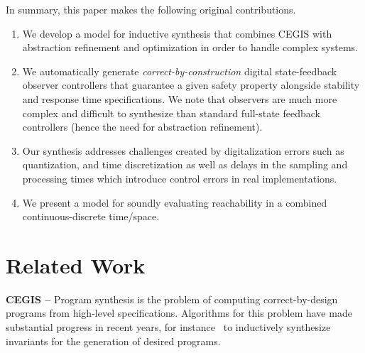 \documentclass[sigconf]{llncs}
\renewcommand{\note}[1]{\textcolor{red}{[#1]}}
\begin{document}
In summary, this paper makes the following original contributions.
%
\begin{enumerate}
%
\item We develop a model for inductive synthesis that combines CEGIS with
  abstraction refinement and optimization in order to handle complex
  systems. 
%
\item We automatically generate \emph{correct-by-construction} digital
  state-feedback observer controllers that guarantee a given safety property
  alongside stability and response time specifications.  We note that
  observers are much more complex and difficult to synthesize than standard
  full-state feedback controllers (hence the need for abstraction refinement).
%
\item  Our synthesis addresses challenges created by digitalization errors
 such as quantization, and time discretization as well as delays in the
 sampling and processing times which introduce control errors in real
 implementations.
 \item We present a model for soundly evaluating reachability in a combined 
 continuous-discrete time/space. 
%
\end{enumerate}


\section{Related Work}
\label{sec:relw}

\textbf{CEGIS --}
Program synthesis is the problem of computing correct-by-design programs
from high-level specifications.  Algorithms for this problem have made
substantial progress in recent years, for instance~\cite{itzhaky2010simple}
to inductively synthesize invariants for the generation of desired programs.
\end{document}
